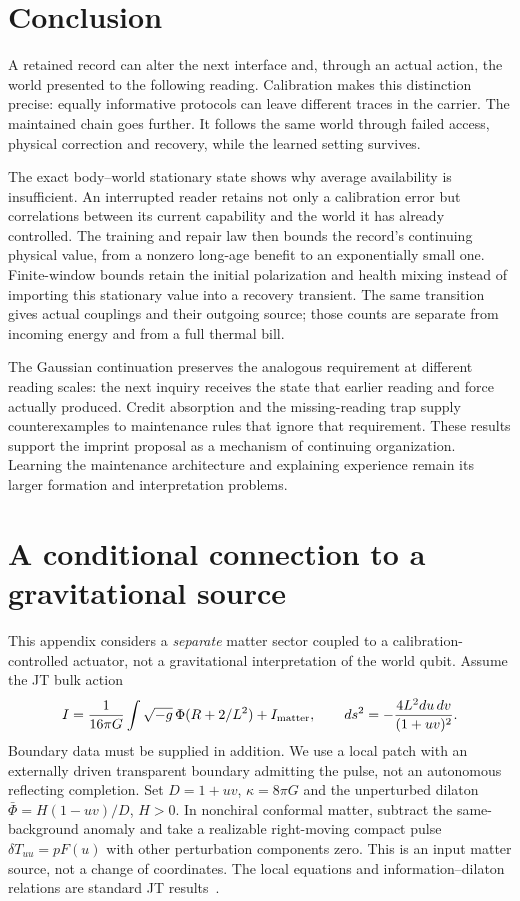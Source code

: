 \documentclass[11pt,a4paper]{article}
\begin{document}
\section{Conclusion}

A retained record can alter the next interface and, through an actual
action, the world presented to the following reading. Calibration
makes this distinction precise: equally informative protocols can
leave different traces in the carrier. The maintained chain goes
further. It follows the same world through failed access, physical
correction and recovery, while the learned setting survives.

The exact body--world stationary state shows why average availability
is insufficient. An interrupted reader retains not only a calibration
error but correlations between its current capability and the world
it has already controlled. The training and repair law then bounds the
record's continuing physical value, from a nonzero long-age benefit to
an exponentially small one. Finite-window bounds retain the initial
polarization and health mixing instead of importing this stationary
value into a recovery transient. The same transition gives actual
couplings and their outgoing source; those counts are separate from
incoming energy and from a full thermal bill.

The Gaussian continuation preserves the analogous requirement at
different reading scales: the next inquiry receives the state that
earlier reading and force actually produced. Credit absorption and
the missing-reading trap supply counterexamples to maintenance rules
that ignore that requirement. These results support the imprint
proposal as a mechanism of continuing organization. Learning the
maintenance architecture and explaining experience remain its
larger formation and interpretation problems.

\appendix
\section{A conditional connection to a gravitational source}\label{app:gravity}

This appendix considers a \emph{separate} matter sector coupled to a calibration-controlled actuator, not a gravitational interpretation of the world qubit. Assume the JT bulk action
\[
 I=\frac1{16\pi G}\int\sqrt{-g}\,\Phi(R+2/L^2)+I_{\rm matter},
 \qquad ds^2=-\frac{4L^2du\,dv}{(1+uv)^2}.
\]
Boundary data must be supplied in addition. We use a local patch with an externally driven transparent boundary admitting the pulse, not an autonomous reflecting completion. Set $D=1+uv$, $\kappa=8\pi G$ and the unperturbed dilaton $\bar\Phi=H(1-uv)/D$, $H>0$. In nonchiral conformal matter, subtract the same-background anomaly and take a realizable right-moving compact pulse $\delta T_{uu}=pF(u)$ with other perturbation components zero. This is an input matter source, not a change of coordinates. The local equations and information--dilaton relations are standard JT results~\cite{Moitra,Callebaut}.
\end{document}
